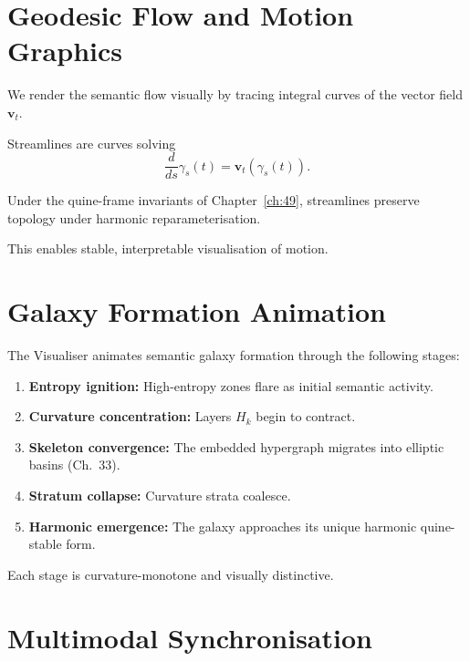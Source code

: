 \section{Geodesic Flow and Motion Graphics}
\label{sec:57:motion}

We render the semantic flow visually by tracing integral curves of the vector
field $\mathbf{v}_t$.

\begin{definition}
Streamlines are curves solving
\[
\frac{d}{ds} \gamma_s(t) = \mathbf{v}_t(\gamma_s(t)).
\]
\end{definition}

\begin{theorem}
Under the quine-frame invariants of Chapter~\ref{ch:49}, streamlines preserve
topology under harmonic reparameterisation.
\end{theorem}

This enables stable, interpretable visualisation of motion.


\section{Galaxy Formation Animation}
\label{sec:57:formation}

The Visualiser animates semantic galaxy formation through the following stages:

\begin{enumerate}
  \item \textbf{Entropy ignition:} High-entropy zones flare as initial semantic
        activity.
  \item \textbf{Curvature concentration:} Layers $H_k$ begin to contract.
  \item \textbf{Skeleton convergence:} The embedded hypergraph migrates into
        elliptic basins (Ch.~33).
  \item \textbf{Stratum collapse:} Curvature strata coalesce.
  \item \textbf{Harmonic emergence:} The galaxy approaches its unique harmonic
        quine-stable form.
\end{enumerate}

Each stage is curvature-monotone and visually distinctive.


\section{Multimodal Synchronisation}
\label{sec:57:sync}

